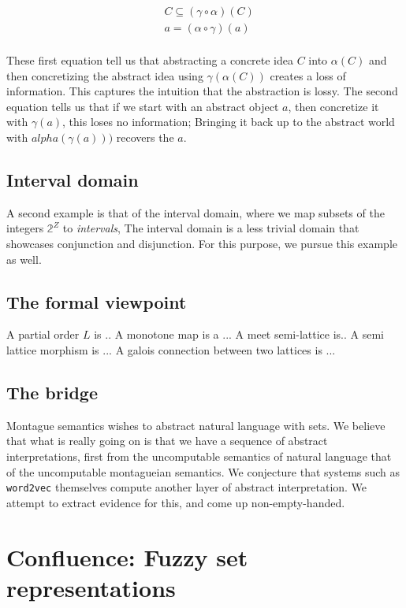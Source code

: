 \documentclass[11pt]{book}
\begin{document}
\begin{align*}
	&C \subseteq (\gamma\circ \alpha)(C) \\
	&a = (\alpha \circ \gamma)(a) \\
\end{align*}

These first equation tell us that abstracting a concrete idea $C$ into $\alpha(C)$ and then
concretizing the abstract idea using $\gamma(\alpha(C))$ creates a loss of information. This captures the intuition that the abstraction is lossy. The second equation tells us that if we start with an abstract object $a$, then concretize it with $\gamma(a)$, this loses no information; Bringing it back up to the abstract world with $alpha(\gamma(a)))$ recovers the $a$. 
\section{Interval domain}


A second example is that of the interval domain, where we map subsets of the integers $\mathbb 2^Z$ to \emph{intervals}, The interval domain is a less trivial domain that showcases conjunction and disjunction. For this purpose, we pursue this example as well.



\section{The formal viewpoint}

A partial order $L$ is .. A monotone map is a ... A meet semi-lattice is.. A semi lattice morphism is ... A galois connection between two lattices is ... 

\section{The bridge}

Montague semantics wishes to abstract natural language with sets. We believe that what is really going on is that we have a sequence of abstract interpretations, first from the uncomputable semantics of natural language that of the uncomputable montagueian semantics. We conjecture that systems such as \texttt{word2vec} themselves compute another layer of abstract interpretation. We attempt to extract evidence for this, and come up non-empty-handed.


\chapter{Confluence: Fuzzy set representations}
\end{document}
